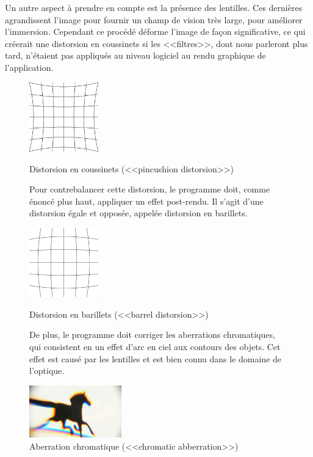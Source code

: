 \documentclass[a4paper,french,12pt]{article}
\begin{document}
			    Un autre aspect à prendre en compte est la présence des lentilles. Ces dernières agrandissent
			    l'image pour fournir un champ de vision très large, pour améliorer l'immersion.
			    Cependant ce procédé déforme l'image de façon significative, ce qui créerait une distorsion
			    en coussinets si les <<filtres>>, dont nous parleront plus tard,
			    n'étaient pas appliqués au niveau logiciel au rendu graphique de l'application.\\
			    \FloatBarrier
			    \begin{figure}[h!]
			      \centering
				\includegraphics[width=3cm]{pincushion_distortion.png}
			      \caption{Distorsion en coussinets (<<pincushion distorsion>>)}\par\medskip
			    
			    \FloatBarrier
			    Pour contrebalancer cette distorsion, le programme doit, comme énoncé plus haut, appliquer
			    un effet post-rendu. Il s'agit d'une distorsion égale et opposée, appelée distorsion en 
			    barillets.\par\bigskip
			    
			    {
			      \centering
				\includegraphics[width=3cm]{barrel_distortion.png}
			      \caption{Distorsion en barillets (<<barrel distorsion>>)}
			    }\par\medskip
			    \FloatBarrier
			    De plus, le programme doit corriger les aberrations chromatiques, qui consistent en un effet
			    d'arc en ciel aux contours des objets. Cet effet est causé par les lentilles et est
			    bien connu dans le domaine de l'optique.\par\bigskip
			    \FloatBarrier
			  {
			      \centering
				\includegraphics[width=4cm]{chromatic_aberration.jpg}
			      \caption{Aberration chromatique (<<chromatic abberration>>)}
			  }
			    \end{figure}  ~ \\
			    
\end{document}
